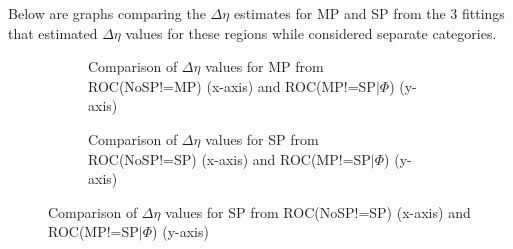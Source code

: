 \documentclass[11pt]{labbook}
\begin{document}
Below are graphs comparing the $\Delta\eta$ estimates for MP and SP from the 3 fittings that estimated $\Delta\eta$ values for these regions while considered separate categories.
\begin{figure}
\begin{subfigure}{0.55\textwidth}
\caption{Comparison of $\Delta\eta$ values for MP from ROC(NoSP!=MP) (x-axis) and ROC(MP!=SP$|\Phi$) (y-axis)}
\end{subfigure}%
\begin{subfigure}{0.55\textwidth}
\caption{Comparison of $\Delta\eta$ values for SP from ROC(NoSP!=SP) (x-axis) and ROC(MP!=SP$|\Phi$) (y-axis)}

\end{subfigure}
\end{figure}
\end{document}
